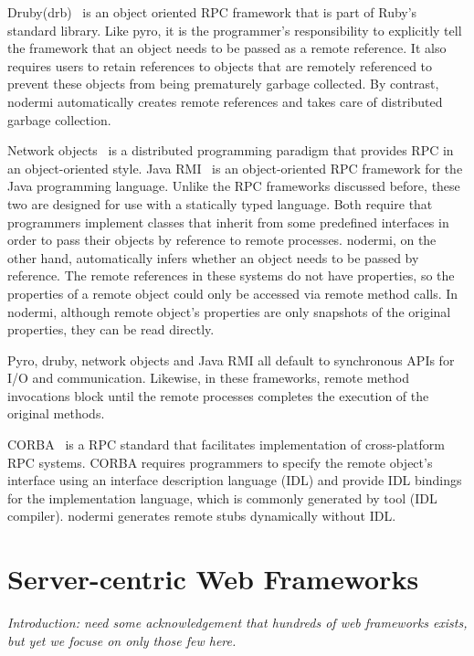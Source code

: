 Druby(drb)~\cite{druby} is an object oriented RPC framework that is part of Ruby's standard
library. Like pyro, it is the programmer's responsibility to explicitly tell
the framework that an object needs to be passed as a remote reference. It also
requires users to retain references to objects that are remotely
referenced  to prevent these objects from being prematurely garbage collected.
By contrast, nodermi automatically creates remote references and
takes care of distributed garbage collection.

Network objects~\cite{birrell1993distributed} is a distributed programming
paradigm that provides RPC in an object-oriented style. Java RMI~\cite{j2eedoc}
is an object-oriented RPC framework for the Java programming language. Unlike the
RPC frameworks discussed before, these two are designed for use with a statically typed language.
Both require that programmers implement classes that inherit from some
predefined interfaces in order to pass their objects by reference to remote processes.
nodermi, on the other hand, automatically infers whether an object needs to be 
passed by reference.  The remote references in these systems do not
have properties, so the properties of a remote object could only be accessed
via remote method calls. In nodermi, 
although remote object's properties are only snapshots of the original properties, 
they can be read directly.


Pyro, druby, network objects and Java RMI all default to synchronous
APIs for I/O and communication.  Likewise, in these frameworks, remote method invocations 
block until the remote processes completes the execution of the original methods.


CORBA~\cite{vinoski1997corba} is a RPC standard that facilitates implementation
of cross-platform RPC systems. CORBA requires programmers to specify  the
remote object's interface using an interface description language (IDL) and 
provide IDL bindings for the implementation language, which is commonly generated 
by tool (IDL compiler). nodermi generates remote stubs dynamically without IDL.

%
%
%
\section{Server-centric Web Frameworks}

\emph{Introduction: need some acknowledgement that hundreds of web frameworks
exists, but yet we focuse on only those few here.}

